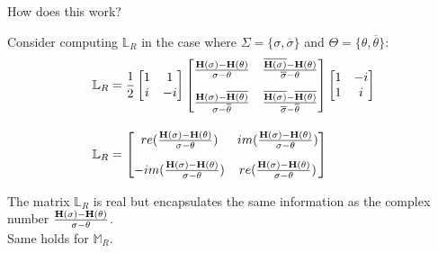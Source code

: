 \begin{frame}{How does this work?}

Consider computing $\mathbb{L}_R$ in the case where $\Sigma = \{\sigma, \overline \sigma\}$ and $\Theta = \{\theta, \overline \theta\}$:\\
\begin{align*}
\mathbb{L}_R &= \frac{1}{2} \begin{bmatrix} 1 & 1\\ i & -i \end{bmatrix}
\begin{bmatrix} \frac{{\bf H}(\sigma) - {\bf H}(\theta)}{\sigma - \theta} & \frac{\overline{{\bf H}(\sigma)} - {\bf H}(\theta)}{\overline \sigma - \theta}\\[1em] \frac{{\bf H}(\sigma) - \overline{{\bf H}(\theta)}}{\sigma - \overline \theta} & \frac{\overline{{\bf H}(\sigma)} - \overline{{\bf H}(\theta)}}{\overline \sigma - \overline \theta} \end{bmatrix}
\begin{bmatrix} 1 & -i\\ 1 & i\end{bmatrix}\\[1em]
\mathbb{L}_R &= \begin{bmatrix} re(\frac{{\bf H}(\sigma) - {\bf H}(\theta)}{\sigma - \theta}) & im(\frac{{\bf H}(\sigma) - {\bf H}(\theta)}{\sigma - \theta}) \\[1em] -im(\frac{{\bf H}(\sigma) - {\bf H}(\theta)}{\sigma - \theta}) & re(\frac{{\bf H}(\sigma) - {\bf H}(\theta)}{\sigma - \theta})\end{bmatrix}
\end{align*}

The matrix $\mathbb{L}_R$ is real but encapsulates the same information as the complex number $\frac{{\bf H}(\sigma) - {\bf H}(\theta)}{\sigma - \theta}$.\\
\bigskip
Same holds for $\mathbb{M}_R$.
\end{frame}